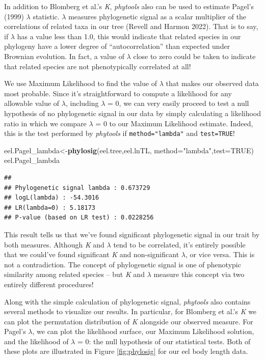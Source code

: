 \documentclass[fleqn,10pt,lineno]{wlpeerj} %
\newenvironment{Shaded}{\begin{snugshade}}{\end{snugshade}}
\newcommand{\AttributeTok}[1]{\textcolor[rgb]{0.13,0.29,0.53}{#1}}
\newcommand{\ConstantTok}[1]{\textcolor[rgb]{0.56,0.35,0.01}{#1}}
\newcommand{\FunctionTok}[1]{\textcolor[rgb]{0.13,0.29,0.53}{\textbf{#1}}}
\newcommand{\NormalTok}[1]{#1}
\newcommand{\OtherTok}[1]{\textcolor[rgb]{0.56,0.35,0.01}{#1}}
\newcommand{\StringTok}[1]{\textcolor[rgb]{0.31,0.60,0.02}{#1}}
\begin{document}
In addition to Blomberg et al.'s \emph{K}, \emph{phytools} also can be used to estimate Pagel's (1999) \(\lambda\) statistic. \(\lambda\) measures phylogenetic signal as a scalar multiplier of the correlations of related taxa in our tree (Revell and Harmon 2022). That is to say, if \(\lambda\) has a value less than 1.0, this would indicate that related species in our phylogeny have a lower degree of ``autocorrelation'' than expected under Brownian evolution. In fact, a value of \(\lambda\) close to zero could be taken to indicate that related species are not phenotypically correlated at all!

We use Maximum Likelihood to find the value of \(\lambda\) that makes our observed data most probable. Since it's straightforward to compute a likelihood for any allowable value of \(\lambda\), including \(\lambda\) = 0, we can very easily proceed to test a null hypothesis of no phylogenetic signal in our data by simply calculating a likelihood ratio in which we compare \(\lambda\) = 0 to our Maximum Likelihood estimate. Indeed, this is the test performed by \emph{phytools} if \texttt{method="lambda"} and \texttt{test=TRUE}!

\begin{Shaded}
\begin{Highlighting}[]
\NormalTok{eel.Pagel\_lambda}\OtherTok{\textless{}{-}}\FunctionTok{phylosig}\NormalTok{(eel.tree,eel.lnTL,}
  \AttributeTok{method=}\StringTok{"lambda"}\NormalTok{,}\AttributeTok{test=}\ConstantTok{TRUE}\NormalTok{)}
\NormalTok{eel.Pagel\_lambda}
\end{Highlighting}
\end{Shaded}

\begin{verbatim}
## 
## Phylogenetic signal lambda : 0.673729 
## logL(lambda) : -54.3016 
## LR(lambda=0) : 5.18173 
## P-value (based on LR test) : 0.0228256
\end{verbatim}

This result tells us that we've found significant phylogenetic signal in our trait by both measures. Although \emph{K} and \(\lambda\) tend to be correlated, it's entirely possible that we could've found significant \emph{K} and non-significant \(\lambda\), or vice versa. This is not a contradiction. The concept of phylogenetic signal is one of phenotypic similarity among related species -- but \emph{K} and \(\lambda\) measure this concept via two entirely different procedures!

Along with the simple calculation of phylogenetic signal, \emph{phytools} also contains several methods to visualize our results. In particular, for Blomberg et al.'s \emph{K} we can plot the permutation distribution of \emph{K} alongside our observed measure. For Pagel's \(\lambda\), we can plot the likelihood surface, our Maximum Likelihood solution, and the likelihood of \(\lambda\) = 0: the null hypothesis of our statistical tests. Both of these plots are illustrated in Figure \ref{fig:phylosig} for our eel body length data.
\end{document}
